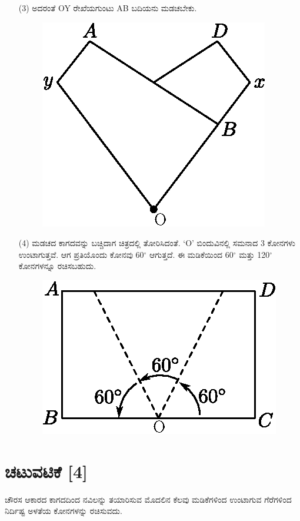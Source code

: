 \begin{enumerate}
\item[(3)] ಅದರಂತೆ OY ರೇಖೆಯಗುಂಟು AB ಬದಿಯನು ಮಡಚಬೇಕು. 
\begin{figure}[H]
\centering
\includegraphics[scale=.98]{src/figure/chap1/fig1-9c.eps}
\end{figure}

\item[(4)] ಮಡಚದ ಕಾಗದವನ್ನು ಬಚ್ಚಿದಾಗ  ಚಿತ್ರದಲ್ಲಿ ತೋರಿಸಿದಂತೆ. `O' ಬಿಂದುವಿನಲ್ಲಿ ಸಮನಾದ 3 ಕೋನಗಳು ಉಂಟಾಗುತ್ತವೆ. ಆಗ ಪ್ರತಿಯೊಂದು ಕೋನವು 60$^\circ$ ಆಗುತ್ತದೆ. ಈ ಮಡಿಕೆಯಿಂದ 60$^\circ$ ಮತ್ತು 120$^\circ$ ಕೋನಗಳನ್ನೂ ರಚಿಸಬಹುದು. 
\begin{figure}[H]
\centering
\includegraphics[scale=.98]{src/figure/chap1/fig1-9d.eps}
\end{figure}
\end{enumerate}

\section*{ಚಟುವಟಿಕೆ [4]} ಚೌರಸ ಆಕಾರದ ಕಾಗದದಿಂದ ನವಿಲನ್ನು ತಯಾರಿಸುವ ಮೊದಲಿನ ಕೆಲವು ಮಡಿಕೆಗಳಿಂದ ಉಂಟಾಗುವ ಗೆರೆಗಳಿಂದ ನಿರ್ದಿಷ್ಟ ಅಳತೆಯ ಕೋನಗಳನ್ನು ರಚಿಸುವದು. 

